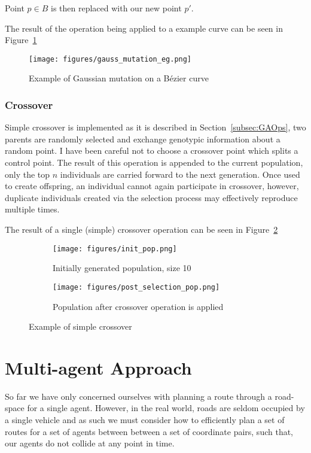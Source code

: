 Point $p \in B$ is then replaced with our new point $p'$.

The result of the operation being applied to a example curve can be seen in Figure~\ref{fig:gauss_mutation_eg}

\begin{figure}[ht]
  \centering
  \texttt{[image: figures/gauss\_mutation\_eg.png]}
  \caption{\label{fig:gauss_mutation_eg} Example of Gaussian mutation on a Bézier curve}
\end{figure}

\subsubsection{Crossover}

Simple crossover is implemented as it is described in Section~\ref{subsec:GAOps}, two parents are randomly selected and exchange genotypic information about a random point. I have been careful not to choose a crossover point which splits a control point. The result of this operation is appended to the current population, only the top $n$ individuals are carried forward to the next generation.
Once used to create offspring, an individual cannot again participate in crossover, however, duplicate individuals created via the selection process may effectively reproduce multiple times.

The result of a single (simple) crossover operation can be seen in Figure~\ref{fig:crossover_eg}

\begin{figure}
  \centering
  \begin{subfigure}[b]{0.44\textwidth}
    \centering
    \texttt{[image: figures/init\_pop.png]}
    \caption{Initially generated population, size 10}
  \end{subfigure}
  \begin{subfigure}[b]{0.44\textwidth}
    \centering
    \texttt{[image: figures/post\_selection\_pop.png]}
    \caption{Population after crossover operation is applied}
  \end{subfigure}
  \caption{\label{fig:crossover_eg} Example of simple crossover}
\end{figure}

\section{Multi-agent Approach}
\label{sec:maa}

So far we have only concerned ourselves with planning a route through a road-space for a single agent. However, in the real world, roads are seldom occupied by a single vehicle and as such we must consider how to efficiently plan a set of routes for a set of agents between between a set of coordinate pairs, such that, our agents do not collide at any point in time.

